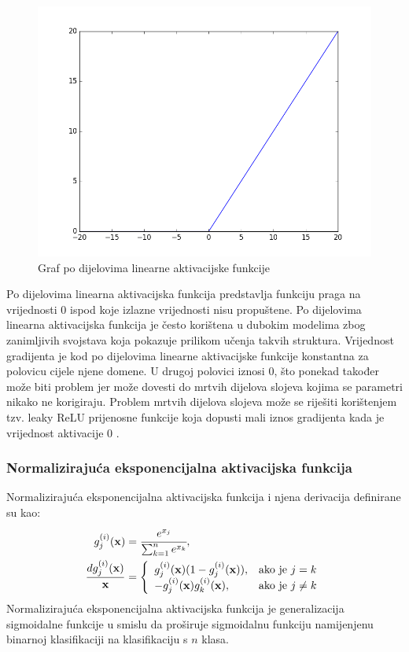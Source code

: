 \documentclass[times, utf8, diplomski, numeric]{fer}
\begin{document}
\begin{figure}[H]
\centering
\includegraphics[scale=0.5]{images/relu_graph.png}
\caption{Graf po dijelovima linearne aktivacijske funkcije}
\label{img:relu_graph}
\end{figure}

\noindent Po dijelovima linearna aktivacijska funkcija predstavlja funkciju praga na vrijednosti $0$ ispod koje izlazne vrijednosti nisu propuštene.
Po dijelovima linearna aktivacijska funkcija je često korištena u dubokim modelima zbog zanimljivih svojstava koja pokazuje prilikom učenja takvih struktura.
Vrijednost gradijenta je kod po dijelovima linearne aktivacijske funkcije konstantna za polovicu cijele njene domene. 
U drugoj polovici iznosi $0$, što ponekad također može biti problem jer može dovesti do mrtvih dijelova slojeva kojima se parametri nikako ne korigiraju.
Problem mrtvih dijelova slojeva može se riješiti korištenjem tzv. leaky ReLU prijenosne funkcije koja dopusti mali iznos gradijenta kada je vrijednost aktivacije $0$ \citep{book:deeplearningbook} \citep{seminar:rela}.

\subsubsection{Normalizirajuća eksponencijalna aktivacijska funkcija}
Normalizirajuća eksponencijalna aktivacijska funkcija  i njena derivacija definirane su kao:
\begin{align}
 g^{(i)}_j(\mathbf{x})&=\cfrac{e^{x_j}}{\sum_{k=1}^{n} e^{x_k}}, \\
 \frac{dg^{(i)}_j(\mathbf{x})}{\mathbf{x}}&=\left\{
 \begin{array}{ll}
 g^{(i)}_j(\mathbf{x}) (1-g^{(i)}_j(\mathbf{x})),  & \mbox{ako je } j = k \\
 -g^{(i)}_j(\mathbf{x}) g^{(i)}_k(\mathbf{x}), & \mbox{ako je } j \neq k 
 \end{array}
 \right.
\end{align}
Normalizirajuća eksponencijalna aktivacijska funkcija je generalizacija sigmoidalne funkcije u smislu da proširuje sigmoidalnu funkciju namijenjenu binarnoj klasifikaciji na klasifikaciju s $n$ klasa.
\end{document}
